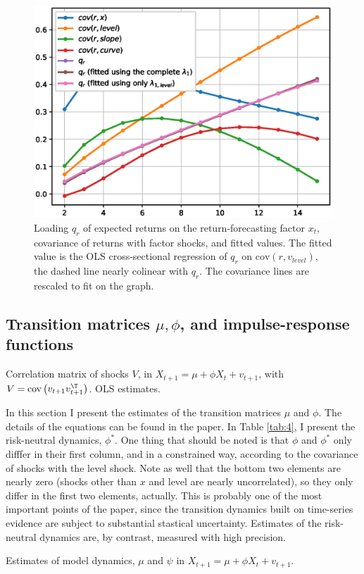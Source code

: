 \begin{figure}[h!]
	\centering
	\caption{Loading $q_r$ of expected returns on the return-forecasting factor $x_t$, covariance of returns with factor shocks, and fitted values. The fitted value is the OLS cross-sectional regression of $q_r$ on $\text{cov}\left(r, v_{level}\right)$, the dashed line nearly colinear with $q_r$. The covariance lines are rescaled to fit on the graph.}\label{fig:6}
	\includegraphics[scale=0.5]{fig/eps/Figure6.eps}
\end{figure}

\subsection{Transition matrices $\mu,\phi$, and impulse-response functions}

\begin{table}[h!]
	\centering
	\caption{Correlation matrix of shocks $V$, in $X_{t+1} = \mu + \phi X_t + v_{t+1}$, with $V = \text{cov}\left(v_{t+1}v_{t+1}^\T\right)$. OLS estimates.}\label{tab:5}
	
\end{table}


In this section I present the estimates of the transition matrices $\mu$ and $\phi$. The details of the equations can be found in the paper. In Table \ref{tab:4}, I present the risk-neutral dynamics, $\phi^\ast$. One thing that should be noted is that $\phi$ and $\phi^\ast$ only difffer in their first column, and in a constrained way, according to the covariance of shocks with the level shock. Note as well that the bottom two elements are nearly zero (shocks other than $x$ and level are nearly uncorrelated), so they only differ in the first two elements, actually. This is probably one of the most important points of the paper, since the transition dynamics built on time-series evidence are subject to substantial stastical uncertainty. Estimates of the risk-neutral dynamics are, by contrast, measured with high precision.
\begin{table}[h!]
	\centering
	\caption{Estimates of model dynamics, $\mu$ and $\psi$ in $X_{t+1} = \mu + \phi X_t + v_{t+1}$.}\label{tab:4}
	
\end{table}


